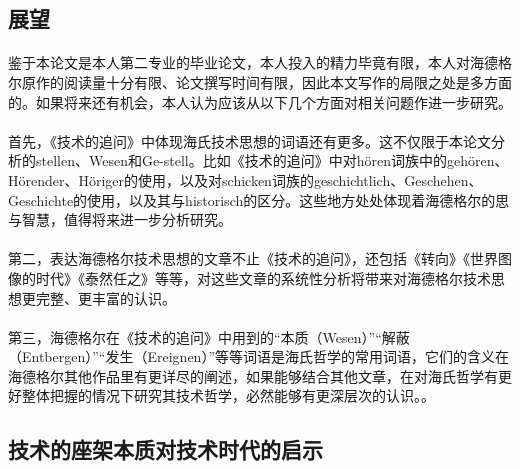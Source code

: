 \documentclass{article}
\begin{document}
	\subsection{展望}
		\paragraph{}
		鉴于本论文是本人第二专业的毕业论文，本人投入的精力毕竟有限，本人对海德格尔原作的阅读量十分有限、论文撰写时间有限，因此本文写作的局限之处是多方面的。如果将来还有机会，本人认为应该从以下几个方面对相关问题作进一步研究。
		\paragraph{}		
		首先，《技术的追问》中体现海氏技术思想的词语还有更多。这不仅限于本论文分析的stellen、Wesen和Ge-stell。比如《技术的追问》中对hören词族中的gehören、Hörender、Höriger的使用，以及对schicken词族的geschichtlich、Geschehen、Geschichte的使用，以及其与historisch的区分。这些地方处处体现着海德格尔的思与智慧，值得将来进一步分析研究。
		\paragraph{}		
		第二，表达海德格尔技术思想的文章不止《技术的追问》，还包括《转向》《世界图像的时代》《泰然任之》等等，对这些文章的系统性分析将带来对海德格尔技术思想更完整、更丰富的认识。
		\paragraph{}		
		第三，海德格尔在《技术的追问》中用到的“本质（Wesen）”“解蔽（Entbergen）”“发生（Ereignen）”等等词语是海氏哲学的常用词语，它们的含义在海德格尔其他作品里有更详尽的阐述，如果能够结合其他文章，在对海氏哲学有更好整体把握的情况下研究其技术哲学，必然能够有更深层次的认识。。
	\subsection{技术的座架本质对技术时代的启示}
		\paragraph{}
		
\renewcommand\refname{参考文献}


\end{document}

